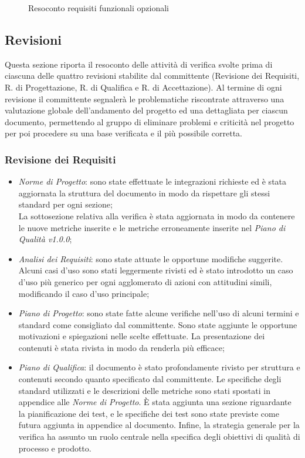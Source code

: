 \begin{itemize}
\begin{figure} [H]
		\caption{Resoconto requisiti funzionali opzionali}
	\end{figure}
\end{itemize}

\newpage



\subsection{Revisioni}
Questa sezione riporta il resoconto delle attività di verifica svolte prima di ciascuna delle quattro revisioni stabilite dal committente (Revisione dei Requisiti, R. di Progettazione, R. di Qualifica e R. di Accettazione).
Al termine di ogni revisione il committente segnalerà le problematiche riscontrate attraverso una valutazione globale dell'andamento del progetto ed una dettagliata per ciascun documento, permettendo al gruppo di eliminare problemi e criticità nel progetto per poi procedere su una base verificata e il più possibile corretta.

\subsubsection{Revisione dei Requisiti}

\begin{itemize}
	\item\emph{Norme di Progetto}: sono state effettuate le integrazioni richieste ed è stata aggiornata la struttura del documento in modo da rispettare gli stessi standard per ogni sezione;\\
	La sottosezione relativa alla verifica è stata aggiornata in modo da contenere le nuove metriche inserite e le metriche erroneamente inserite nel \emph{Piano di Qualità v1.0.0};	\item\emph{Analisi dei Requisiti}: sono state attuate le opportune modifiche suggerite. Alcuni casi d'uso sono stati leggermente rivisti ed è stato introdotto un caso d'uso più generico per ogni agglomerato di azioni con attitudini simili, modificando il caso d'uso principale; 	
	\item\emph{Piano di Progetto}: sono state fatte alcune verifiche nell'uso di alcuni termini e standard come consigliato dal committente. Sono state aggiunte le opportune motivazioni e spiegazioni nelle scelte effettuate. La presentazione dei contenuti è stata rivista in modo da renderla più efficace;
	\item\emph{Piano di Qualifica}: il documento è stato profondamente rivisto per struttura e contenuti secondo quanto specificato dal committente.
	Le specifiche degli standard utilizzati e le descrizioni delle metriche sono stati spostati in appendice alle \emph{Norme di Progetto}. È stata aggiunta una sezione riguardante la pianificazione dei test, e le specifiche dei test sono state previste come futura aggiunta in appendice al documento. Infine, la strategia generale per la verifica ha assunto un ruolo centrale nella specifica degli obiettivi di qualità di processo e prodotto. 
\end{itemize}


